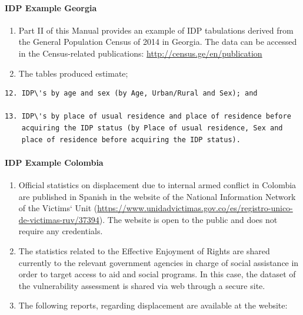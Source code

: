 \documentclass[
]{article}
\begin{document}
\hypertarget{idp-example-georgia-1}{%
\paragraph{IDP Example Georgia}\label{idp-example-georgia-1}}

\begin{enumerate}
\def\labelenumi{\arabic{enumi}.}
\setcounter{enumi}{415}
\item
  Part II of this Manual provides an example of IDP tabulations
  derived from the General Population Census of 2014 in Georgia. The
  data can be accessed in the Census-related publications:
  \url{http://census.ge/en/publication}
\item
  The tables produced estimate;
\end{enumerate}

\begin{verbatim}
12. IDP\'s by age and sex (by Age, Urban/Rural and Sex); and

13. IDP\'s by place of usual residence and place of residence before
    acquiring the IDP status (by Place of usual residence, Sex and
    place of residence before acquiring the IDP status).
\end{verbatim}

\hypertarget{idp-example-colombia-1}{%
\paragraph{IDP Example Colombia}\label{idp-example-colombia-1}}

\begin{enumerate}
\def\labelenumi{\arabic{enumi}.}
\setcounter{enumi}{417}
\item
  Official statistics on displacement due to internal armed conflict
  in Colombia are published in Spanish in the website of the National
  Information Network of the Victims` Unit
  (\url{https://www.unidadvictimas.gov.co/es/registro-unico-de-victimas-ruv/37394}).
  The website is open to the public and does not require any
  credentials.
\item
  The statistics related to the Effective Enjoyment of Rights are
  shared currently to the relevant government agencies in charge of
  social assistance in order to target access to aid and social
  programs. In this case, the dataset of the vulnerability assessment
  is shared via web through a secure site.
\item
  The following reports, regarding displacement are available at the
  website:
\end{enumerate}
\end{document}

